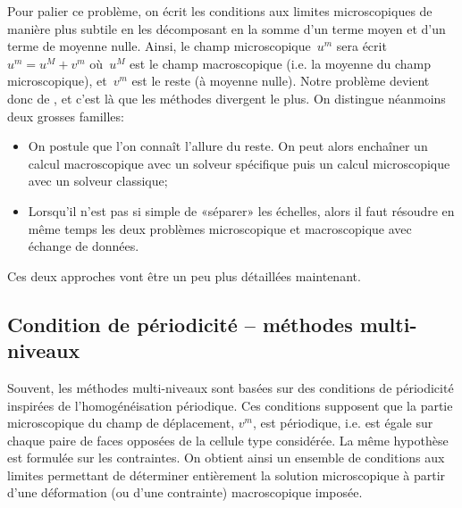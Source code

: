 
Pour palier ce problème, on écrit les conditions aux limites microscopiques de manière plus subtile en les décomposant en la somme d'un terme moyen et d'un terme de moyenne nulle. Ainsi, le champ microscopique~$u^m$ sera écrit~$u^m=u^M +v^m$ où~$u^M$ est le champ macroscopique (i.e. la moyenne du champ microscopique), et~$v^m$ est le reste (à moyenne nulle).
Notre problème devient donc de , et c'est là que les méthodes divergent le plus. On distingue néanmoins deux grosses familles:
\begin{itemize}
  \item {}

	On postule que l'on connaît l'allure du reste. On peut alors enchaîner un calcul macroscopique avec un solveur spécifique puis un calcul microscopique avec un solveur classique;
  \item {}

	Lorsqu'il n'est pas si simple de «séparer» les échelles, alors il faut résoudre en même temps les deux problèmes microscopique et macroscopique avec échange de données.
\end{itemize}
Ces deux approches vont être un peu plus détaillées maintenant.




\medskip
\subsection{Condition de périodicité -- méthodes multi-niveaux}

Souvent, les méthodes multi-niveaux sont basées sur des conditions de périodicité inspirées de l'homogénéisation périodique. Ces conditions supposent que la partie microscopique du champ de déplacement, $v^m$, est périodique, i.e. est égale sur chaque paire de faces opposées de la cellule type considérée. La même hypothèse est formulée sur les contraintes. On obtient ainsi un ensemble de conditions aux limites permettant de déterminer entièrement la solution microscopique à partir d'une déformation (ou d'une contrainte) macroscopique imposée.

